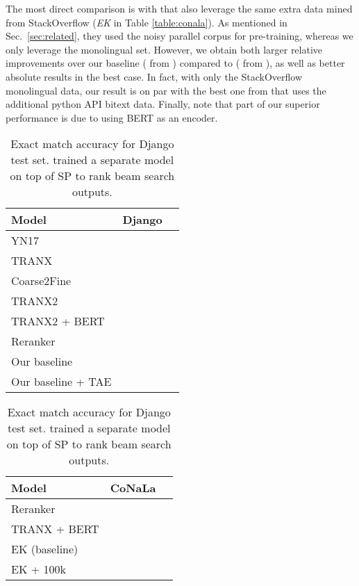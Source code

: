 The most direct comparison is with \citet{xu2020incorporating} that also leverage the same extra data mined from StackOverflow ({\em EK} in Table \ref{table:conala}). As mentioned in Sec.\ \ref{sec:related}, they used the noisy parallel corpus for pre-training, whereas we only leverage the monolingual set. However, we obtain both larger relative improvements over our baseline ( from ) compared to \citet{xu2020incorporating} ( from ), as well as better absolute results in the best case. In fact, with only the  StackOverflow monolingual data, our result is on par with the best one from \citet{xu2020incorporating} that uses the additional python API bitext data. Finally, note that part of our superior performance is due to using BERT as an encoder.



\begin{table}[h]
\centering
\small
\begin{tabular}{lll}
\hline \textbf{Model} & \textbf{Django} \\ \hline
\small YN17 \scriptsize \cite{yin2017syntactic} &  \\
\small TRANX \scriptsize \cite{yin2018tranx} &  \\
\small Coarse2Fine \scriptsize \cite{dong2018coarse} & \\
\small TRANX2 \scriptsize \cite{yin2019reranking} &  \\
\small TRANX2 + BERT &  \\
\small Reranker \scriptsize \cite{yin2019reranking} &  \\
\hline
\small Our baseline &  \\
\small Our baseline + TAE &  {\boldmath } \\
\hline
\end{tabular}
\vspace{-0.5em}
\caption{\label{table:django} Exact match accuracy for Django test set. \citet{yin2019reranking} trained a separate model on top of SP to rank beam search outputs.}
    \vspace{1em}
\centering
\small
\begin{tabular}{lll}
\hline \textbf{Model} & \textbf{CoNaLa} \\ \hline
\small Reranker \scriptsize \cite{yin2019reranking} &  \\
\small TRANX {\scriptsize \cite{yin2019reranking}} + BERT &  \\
\small EK (baseline) \scriptsize \cite{xu2020incorporating} &  \\
\small EK + 100k \scriptsize \cite{xu2020incorporating} &  \\

\end{tabular}
\end{table}
